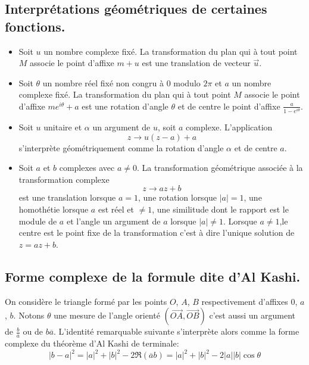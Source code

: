\subsection{ Interprétations géométriques de certaines fonctions.}
\begin{itemize}
 \item Soit $u$ un nombre complexe fixé. La transformation du plan qui à tout point $M$ associe le point d'affixe $m+u$ est une translation de vecteur $\overrightarrow u$.
 \item Soit $\theta$ un nombre réel fixé non congru à $0$ modulo $2\pi$ et $a$ un nombre complexe fixé. La transformation du plan qui à tout point $M$ associe le point d'affixe $me^{i\theta}+a$ est une rotation d'angle $\theta$ et de centre le point d'affixe $\frac{a}{1-e^{i\theta}}$.
 \item Soit $u$ unitaire et $\alpha$ un argument de $u$, soit $a$ complexe. L'application 
\begin{displaymath}
 z\rightarrow u(z-a) +a
\end{displaymath}
s'interprète géométriquement comme la rotation d'angle $\alpha$ et de centre $a$.
\item Soit $a$ et $b$ complexes avec $a\neq 0$. La transformation géométrique associée à la transformation complexe
\begin{displaymath}
 z\rightarrow az +b
\end{displaymath}
est une translation lorsque $a=1$, une rotation lorsque $|a|=1$, une homothétie lorsque $a$ est réel et $\neq1$, une similitude dont le rapport est le module de $a$ et l'angle un argument de $a$ lorsque $|a|\neq 1$. Lorsque $a \neq 1$,le centre est le point fixe de la transformation c'est à dire l'unique solution de $z = az +b$.
\end{itemize}

\subsection{ Forme complexe de la formule dite d'Al Kashi.} 
On considère le triangle formé par les points $O$, $A$, $B$ respectivement d'affixes $0$, $a$, $b$. Notons $\theta$ une mesure de l'angle orienté $(\overrightarrow{OA},\overrightarrow{OB})$ c'est aussi un argument de $\frac{b}{a}$ ou de $b\overline{a}$. L'identité remarquable suivante s'interprète alors comme la forme complexe du théorème d'Al Kashi de terminale:
\begin{displaymath}
 |b-a|^2 = |a|^2 + |b|^2 -2\Re (\overline{a}b) = |a|^2 + |b|^2 -2|a||b|\cos \theta
\end{displaymath}

